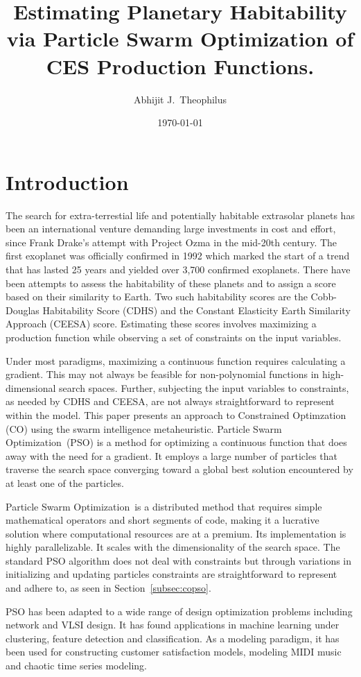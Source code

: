\documentclass[10pt]{article}
\title{Estimating Planetary Habitability via Particle Swarm Optimization of CES Production Functions.}
\author{Abhijit J.\ Theophilus}
\date{\today}
\newcommand{\pso}{Particle Swarm Optimization}
\begin{document}
\maketitle


\section{Introduction}\label{sec:intro}
The search for extra-terrestial life and potentially habitable extrasolar planets has been an international venture
demanding large investments in cost and effort, since Frank Drake's attempt with Project Ozma in the mid-20th century.
The first exoplanet was officially confirmed in 1992 which marked the start of a trend that has lasted 25 years and
yielded over 3,700 confirmed exoplanets. There have been attempts to assess the habitability of these planets and to
assign a score based on their similarity to Earth. Two such habitability scores are the Cobb-Douglas Habitability Score
(CDHS) and the Constant Elasticity Earth Similarity Approach (CEESA) score. Estimating these scores involves maximizing
a production function while observing a set of constraints on the input variables.

Under most paradigms, maximizing a continuous function requires calculating a gradient. This may not always be feasible
for non-polynomial functions in high-dimensional search spaces. Further, subjecting the input variables to constraints,
as needed by CDHS and CEESA, are not always straightforward to represent within the model. This paper presents an
approach to Constrained Optimzation (CO) using the swarm intelligence metaheuristic. \pso\ (PSO) is a method for
optimizing a continuous function that does away with the need for a gradient. It employs a large number of particles
that traverse the search space converging toward a global best solution encountered by at least one of the particles.

\pso\ is a distributed method that requires simple mathematical operators and short segments of code, making it a
lucrative solution where computational resources are at a premium. Its implementation is highly parallelizable. It
scales with the dimensionality of the search space. The standard PSO algorithm does not deal with constraints but
through variations in initializing and updating particles constraints are straightforward to represent and adhere to, as
seen in Section~\ref{subsec:copso}.

PSO has been adapted to a wide range of design optimization problems including network and VLSI design. It has found
applications in machine learning under clustering, feature detection and classification. As a modeling paradigm, it has
been used for constructing customer satisfaction models, modeling MIDI music and chaotic time series modeling.
\end{document}
